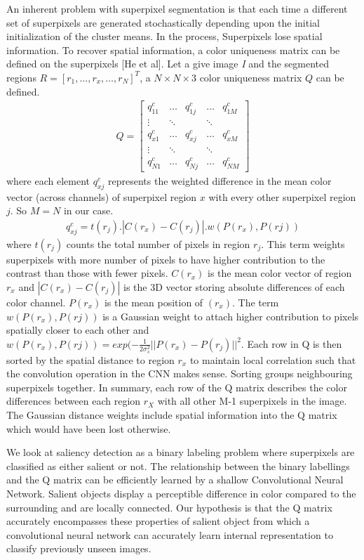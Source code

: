 \documentclass[journal]{IEEEtran}
\begin{document}
{An inherent problem with superpixel segmentation is that each time a different set of superpixels are generated stochastically depending upon the initial initialization of the cluster means. In the process, Superpixels lose spatial information. To recover spatial information, a color uniqueness matrix can be defined on the superpixels [He et al]. Let a give image \textit{I} and the segmented regions $ R = [r_1, \dots, r_x, \dots, r_N]^T $, a $N\times N\times 3$ color uniqueness matrix $Q$ can be defined. \\
\begin{align*}
Q = \begin{bmatrix}
q_{11}^c&\dots&q_{1j}^c&\dots&q_{1M}^c\\
\vdots&\ddots&&\ddots&\\
q_{x1}^c&\dots&q_{xj}^c&\dots&q_{xM}^c\\
\vdots&\ddots&&\ddots&\\
q_{N1}^c&\dots&q_{Nj}^c&\dots&q_{NM}^c
\end{bmatrix}
\end{align*}
where each element $q_{xj}^c$ represents the weighted difference in the mean color vector (across channels) of superpixel region $x$ with every other superpixel region $j$. So $M=N$ in our case.
\begin{align*}
q_{xj}^c = t(r_j).|C(r_x)-C(r_j)|.w(P(r_x),P(rj))
\end{align*}
where $t(r_j)$ counts the total number of pixels in region $r_j$. This term weights superpixels with more number of pixels to have higher contribution to the contrast than those with fewer pixels. $C(r_x)$ is the mean color vector of region $r_x$ and $|C(r_x)-C(r_j)|$ is the 3D vector storing absolute differences of each color channel. $P(r_x)$ is the mean position of $(r_x)$. The term $w(P(r_x),P(rj))$ is a Gaussian weight to attach higher contribution to pixels spatially closer to each other and $w(P(r_x),P(rj)) = exp(-\frac{1}{2\sigma_s^2}||P(r_x)-P(r_j)||^2$. Each row in Q is then sorted by the spatial distance to region $r_x$ to maintain local correlation such that the convolution operation in the CNN makes sense. Sorting groups neighbouring superpixels together. In summary, each row of the Q matrix describes the color differences between each region $r_X$ with all other M-1 superpixels in the image. The Gaussian distance weights include spatial information into the Q matrix which would have been lost otherwise. 

We look at saliency detection as a binary labeling problem where superpixels are classified as either salient or not. The relationship between the binary labellings and the Q matrix can be efficiently learned by a shallow Convolutional Neural Network. Salient objects display a perceptible difference in color compared to the surrounding and are locally connected. Our hypothesis is that the Q matrix accurately encompasses these properties of salient object from which a convolutional neural network can accurately learn internal representation to classify previously unseen images. 

}
\end{document}
